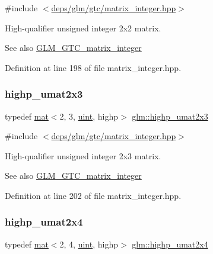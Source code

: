{\ttfamily \#include $<$\hyperlink{matrix__integer_8hpp}{deps/glm/gtc/matrix\+\_\+integer.\+hpp}$>$}

High-\/qualifier unsigned integer 2x2 matrix. \begin{DoxySeeAlso}{See also}
\hyperlink{group__gtc__matrix__integer}{G\+L\+M\+\_\+\+G\+T\+C\+\_\+matrix\+\_\+integer} 
\end{DoxySeeAlso}


Definition at line 198 of file matrix\+\_\+integer.\+hpp.

\mbox{\label{group__gtc__matrix__integer_ga0264db97a9144fa08315b5a4f455872f}} 
\subsubsection{\texorpdfstring{highp\+\_\+umat2x3}{highp\_umat2x3}}
{\footnotesize\ttfamily typedef \hyperlink{structglm_1_1mat}{mat}$<$2, 3, \hyperlink{group__core__precision_ga4fd29415871152bfb5abd588334147c8}{uint}, highp$>$ \hyperlink{group__gtc__matrix__integer_ga0264db97a9144fa08315b5a4f455872f}{glm\+::highp\+\_\+umat2x3}}



{\ttfamily \#include $<$\hyperlink{matrix__integer_8hpp}{deps/glm/gtc/matrix\+\_\+integer.\+hpp}$>$}

High-\/qualifier unsigned integer 2x3 matrix. \begin{DoxySeeAlso}{See also}
\hyperlink{group__gtc__matrix__integer}{G\+L\+M\+\_\+\+G\+T\+C\+\_\+matrix\+\_\+integer} 
\end{DoxySeeAlso}


Definition at line 202 of file matrix\+\_\+integer.\+hpp.

\mbox{\label{group__gtc__matrix__integer_ga451e726ea1f020c97b2f8aa41242055b}} 
\subsubsection{\texorpdfstring{highp\+\_\+umat2x4}{highp\_umat2x4}}
{\footnotesize\ttfamily typedef \hyperlink{structglm_1_1mat}{mat}$<$2, 4, \hyperlink{group__core__precision_ga4fd29415871152bfb5abd588334147c8}{uint}, highp$>$ \hyperlink{group__gtc__matrix__integer_ga451e726ea1f020c97b2f8aa41242055b}{glm\+::highp\+\_\+umat2x4}}



